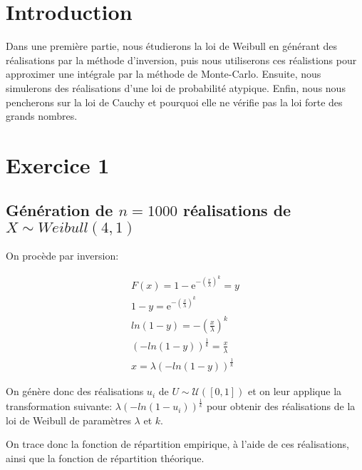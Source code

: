 \documentclass{article}
\begin{document}
\begin{multicols}{2}

\section{Introduction}\label{sec:intro}

Dans une première partie, nous étudierons la loi de Weibull en générant des
réalisations par la méthode d'inversion, puis nous utiliserons ces réalistions
pour approximer une intégrale par la méthode de Monte-Carlo. Ensuite, nous
simulerons des réalisations d'une loi de probabilité atypique. Enfin, nous nous
pencherons sur la loi de Cauchy et pourquoi elle ne vérifie pas la loi forte des
grands nombres.


\section{Exercice 1}\label{sec:ex1}

\subsection{Génération de $n = 1000$ réalisations de $X \sim Weibull(4, 1)$}\label{subsec:ex11}

On procède par inversion:

\begin{equation}
    \begin{multlined}
        F(x) = 1 - \mathrm{e}^{-\left({\frac{x}{\lambda}}\right)^k} = y \\
        1 - y = \mathrm{e}^{-\left({\frac{x}{\lambda}}\right)^k} \\
        ln(1 - y) = -\left(\frac{x}{\lambda}\right)^k \\
        (-ln(1 - y))^{\frac{1}{k}} = \frac{x}{\lambda} \\
        x = \lambda (-ln(1 - y))^{\frac{1}{k}}
    \end{multlined}
\end{equation}

On génère donc des réalisations $u_i$ de $U \sim \mathcal{U}([0, 1])$ et on
leur applique la transformation suivante: $\lambda (-ln(1 - u_i))^{\frac{1}{k}}$
pour obtenir des réalisations de la loi de Weibull de paramètres $\lambda$ et
$k$.

On trace donc la fonction de répartition empirique, à l'aide de ces
réalisations, ainsi que la fonction de répartition théorique.


\end{multicols}
\end{document}
